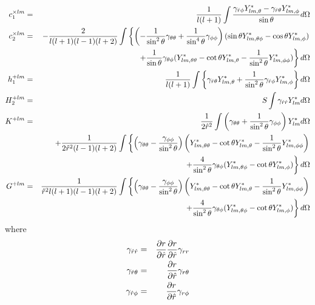 \begin{eqnarray*}
c_1^{\times lm}  &=&  \frac{1}{l(l+1)}
                      \int \frac{\gamma_{\hat{r}\phi}Y^*_{lm,\theta}
                                -\gamma_{\hat{r}\theta} Y^*_{lm,\phi} }
                     {\sin\theta}d\Omega
\\
c_2^{\times lm} & = & -\frac{2}{l(l+1)(l-1)(l+2)}
                      \int\left\{
           \left(-\frac{1}{\sin^2\theta}\gamma_{\theta\theta}+\frac{1}
           {\sin^4\theta}\gamma_{\phi\phi}\right)
           (\sin\theta Y^*_{lm,\theta\phi}-\cos\theta Y^*_{lm,\phi})
\right.
\\
&&\left.
           + \frac{1}{\sin\theta} \gamma_{\theta\phi}
           (Y^*_{lm,\theta\theta}-\cot\theta Y^*_{lm,\theta}
           -\frac{1}{\sin^2\theta}Y^*_{lm,\phi\phi}) \right\}d\Omega
\\
h_1^{+lm} &=& \frac{1}{l(l+1)}
            \int \left\{
                \gamma_{\hat{r}\theta} Y^*_{lm,\theta} + \frac{1}{\sin^2\theta}
                \gamma_{\hat{r}\phi}Y^*_{lm,\phi}\right\} d\Omega
\\
H_2^{+lm} &=& S  \int \gamma_{\hat{r}\hat{r}} Y^*_{lm} d\Omega
\\
K^{+lm}   &=& \frac{1}{2\hat{r}^2} \int \left(\gamma_{\theta\theta}+
           \frac{1}{\sin^2\theta}\gamma_{\phi\phi}\right)Y^*_{lm}
           d\Omega
\\
          &&+\frac{1}{2\hat{r}^2(l-1)(l+2)}
\int \left\{
  \left(\gamma_{\theta\theta}-\frac{\gamma_{\phi\phi}}{\sin^2\theta}\right)
    \left(Y^*_{lm,\theta\theta}-\cot\theta Y^*_{lm,\theta}-\frac{1}{\sin^2\theta}
    Y^*_{lm,\phi\phi}\right) 
\right.
\\
&&\left.
   + \frac{4}{\sin^2\theta}\gamma_{\theta\phi}(Y^*_{lm,\theta\phi}-\cot\theta
     Y^*_{lm,\phi})
     \right \} d\Omega
\\
G^{+lm}  &=& \frac{1}{\hat{r}^2 l(l+1)(l-1)(l+2)}
  \int \left\{
  \left(\gamma_{\theta\theta}-\frac{\gamma_{\phi\phi}}{\sin^2\theta}\right)
    \left(Y^*_{lm,\theta\theta}-\cot\theta Y^*_{lm,\theta}-\frac{1}{\sin^2\theta}
    Y^*_{lm,\phi\phi}\right) 
\right.
\\
&&\left.
   +\frac{4}{\sin^2\theta}\gamma_{\theta\phi}(Y^*_{lm,\theta\phi}-\cot\theta
   Y^*_{lm,\phi})
   \right\}d\Omega
\end{eqnarray*}
where
\begin{eqnarray}
\gamma_{\hat{r}\hat{r}}      & = & \frac{\partial r}{\partial \hat{r}}
                       \frac{\partial r}{\partial \hat{r}}
                       \gamma_{rr} 
\\
\gamma_{\hat{r}\theta} & = & \frac{\partial r}{\partial \hat{r}}
                       \gamma_{r\theta} 
\\
\gamma_{\hat{r}\phi}   & = & \frac{\partial r}{\partial \hat{r}}
                       \gamma_{r\phi}
\end{eqnarray}

